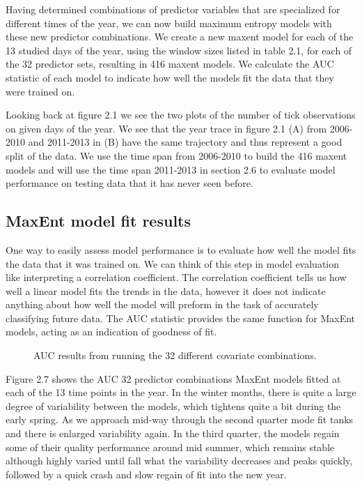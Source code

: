 Having determined combinations of predictor variables that are specialized for different times of the year, we can now build maximum entropy models with these new predictor combinations. We create a new maxent model for each of the 13 studied days of the year, using the window sizes listed in table 2.1, for each of the 32 predictor sets, resulting in 416 maxent models. We calculate the AUC statistic of each model to indicate how well the models fit the data that they were trained on. \newline

\noindent Looking back at figure 2.1 we see the two plots of the number of tick observations on given days of the year. We see that the year trace in figure 2.1 (A)  from 2006-2010 and 2011-2013 in (B) have the same trajectory and thus represent a good split of the data. We use the time span from 2006-2010 to build the 416 maxent models and will use the time span 2011-2013 in section 2.6 to evaluate model performance on testing data that it has never seen before. \newline

\subsection{ MaxEnt model fit results}

One way to easily assess model performance is to evaluate how well the model fits the data that it was trained on. We can think of this step in model evaluation like interpreting a correlation coefficient. The correlation coefficient tells us how well a linear model fits the trends in the data, however it does not indicate anything about how well the model will preform in the task of accurately classifying future data. The AUC statistic provides the same function for MaxEnt models, acting as an indication of goodness of fit. \newline

\begin{figure} [!ht]
\centerline{}
\caption{AUC results from running the 32 different covariate combinations. }
\label{fig6}
\end{figure}


\noindent Figure 2.7 shows the AUC 32 predictor combinations MaxEnt models fitted at each of the 13 time points in the year. In the winter months, there is quite a large degree of variability between the models, which tightens quite a bit during the early spring. As we approach mid-way through the second quarter mode fit tanks and there is enlarged variability again. In the third quarter, the models regain some of their quality performance around mid summer, which remains stable although highly varied until fall what the variability decreases and peaks quickly, followed by a quick crash and slow regain of fit into the new year. 


